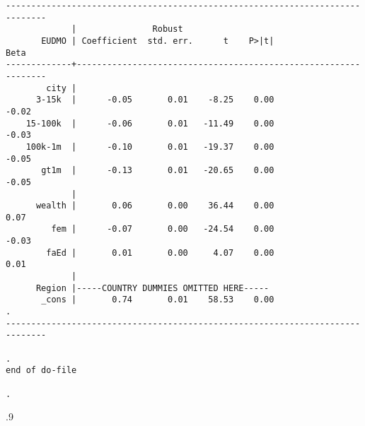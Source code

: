 \documentclass[10pt, letterpaper]{article}
\begin{document}
\begin{spacing}{1.4}
\begin{spacing}{.5}
\begin{scriptsize}
\begin{verbatim}
------------------------------------------------------------------------------
             |               Robust
       EUDMO | Coefficient  std. err.      t    P>|t|                     Beta
-------------+----------------------------------------------------------------
        city |
      3-15k  |      -0.05       0.01    -8.25    0.00                    -0.02
    15-100k  |      -0.06       0.01   -11.49    0.00                    -0.03
    100k-1m  |      -0.10       0.01   -19.37    0.00                    -0.05
       gt1m  |      -0.13       0.01   -20.65    0.00                    -0.05
             |
      wealth |       0.06       0.00    36.44    0.00                     0.07
         fem |      -0.07       0.00   -24.54    0.00                    -0.03
        faEd |       0.01       0.00     4.07    0.00                     0.01
             |
      Region |-----COUNTRY DUMMIES OMITTED HERE-----
       _cons |       0.74       0.01    58.53    0.00                        .
------------------------------------------------------------------------------

. 
end of do-file

. 

\end{verbatim}
\end{scriptsize}
\end{spacing}{.9}









\end{spacing}
\end{document}
